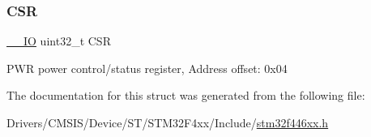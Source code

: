 \subsubsection{\texorpdfstring{C\+SR}{CSR}}
{\footnotesize\ttfamily \mbox{\hyperlink{core__sc300_8h_aec43007d9998a0a0e01faede4133d6be}{\+\_\+\+\_\+\+IO}} uint32\+\_\+t C\+SR}

P\+WR power control/status register, Address offset\+: 0x04 

The documentation for this struct was generated from the following file\+:\begin{DoxyCompactItemize}
\item 
Drivers/\+C\+M\+S\+I\+S/\+Device/\+S\+T/\+S\+T\+M32\+F4xx/\+Include/\mbox{\hyperlink{stm32f446xx_8h}{stm32f446xx.\+h}}\end{DoxyCompactItemize}
